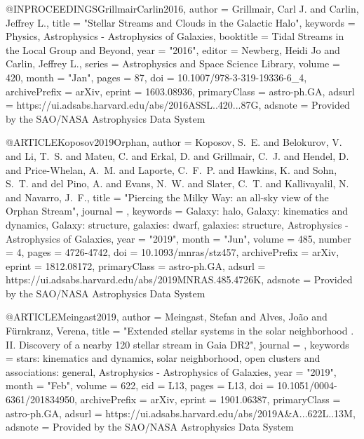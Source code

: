 \documentclass[apj]{emulateapj}
\begin{document}
{{{{@INPROCEEDINGS{GrillmairCarlin2016,
       author = {{Grillmair}, Carl J. and {Carlin}, Jeffrey L.},
        title = "{Stellar Streams and Clouds in the Galactic Halo}",
     keywords = {Physics, Astrophysics - Astrophysics of Galaxies},
    booktitle = {Tidal Streams in the Local Group and Beyond},
         year = "2016",
       editor = {{Newberg}, Heidi Jo and {Carlin}, Jeffrey L.},
       series = {Astrophysics and Space Science Library},
       volume = {420},
        month = "Jan",
        pages = {87},
          doi = {10.1007/978-3-319-19336-6_4},
archivePrefix = {arXiv},
       eprint = {1603.08936},
 primaryClass = {astro-ph.GA},
       adsurl = {https://ui.adsabs.harvard.edu/abs/2016ASSL..420...87G},
      adsnote = {Provided by the SAO/NASA Astrophysics Data System}
}




@ARTICLE{Koposov2019Orphan,
       author = {{Koposov}, S.~E. and {Belokurov}, V. and {Li}, T.~S. and {Mateu}, C. and
         {Erkal}, D. and {Grillmair}, C.~J. and {Hendel}, D. and
         {Price-Whelan}, A.~M. and {Laporte}, C.~F.~P. and {Hawkins}, K. and
         {Sohn}, S.~T. and {del Pino}, A. and {Evans}, N.~W. and
         {Slater}, C.~T. and {Kallivayalil}, N. and {Navarro}, J.~F.},
        title = "{Piercing the Milky Way: an all-sky view of the Orphan Stream}",
      journal = {\mnras},
     keywords = {Galaxy: halo, Galaxy: kinematics and dynamics, Galaxy: structure, galaxies: dwarf, galaxies: structure, Astrophysics - Astrophysics of Galaxies},
         year = "2019",
        month = "Jun",
       volume = {485},
       number = {4},
        pages = {4726-4742},
          doi = {10.1093/mnras/stz457},
archivePrefix = {arXiv},
       eprint = {1812.08172},
 primaryClass = {astro-ph.GA},
       adsurl = {https://ui.adsabs.harvard.edu/abs/2019MNRAS.485.4726K},
      adsnote = {Provided by the SAO/NASA Astrophysics Data System}
}



@ARTICLE{Meingast2019,
       author = {{Meingast}, Stefan and {Alves}, Jo{\~a}o and {F{\"u}rnkranz}, Verena},
        title = "{Extended stellar systems in the solar neighborhood . II. Discovery of a nearby 120{\textdegree} stellar stream in Gaia DR2}",
      journal = {\aap},
     keywords = {stars: kinematics and dynamics, solar neighborhood, open clusters and associations: general, Astrophysics - Astrophysics of Galaxies},
         year = "2019",
        month = "Feb",
       volume = {622},
          eid = {L13},
        pages = {L13},
          doi = {10.1051/0004-6361/201834950},
archivePrefix = {arXiv},
       eprint = {1901.06387},
 primaryClass = {astro-ph.GA},
       adsurl = {https://ui.adsabs.harvard.edu/abs/2019A&A...622L..13M},
      adsnote = {Provided by the SAO/NASA Astrophysics Data System}
}



}}}}
\end{document}
